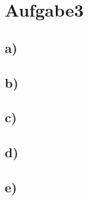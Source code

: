 \newpage
\section{Aufgabe3}
\label{sec:a3}

\subsection{a)}
\label{subsec:a3a}

\subsection{b)}
\label{subsec:a3b}

\subsection{c)}
\label{subsec:a3c}

\subsection{d)}
\label{subsec:a3d}


\subsection{e)}
\label{subsec:a3e}
